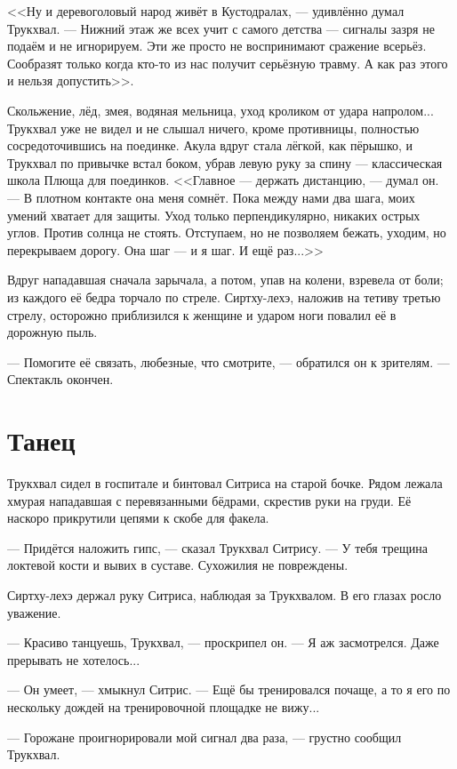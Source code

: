 <<Ну и деревоголовый народ живёт в Кустодралах, --- удивлённо думал Трукхвал.
--- Нижний этаж же всех учит с самого детства --- сигналы зазря не подаём и не игнорируем.
Эти же просто не воспринимают сражение всерьёз.
Сообразят только когда кто-то из нас получит серьёзную травму.
А как раз этого и нельзя допустить>>.

Скольжение, лёд, змея, водяная мельница, уход кроликом от удара напролом...
Трукхвал уже не видел и не слышал ничего, кроме противницы, полностью сосредоточившись на поединке.
Акула вдруг стала лёгкой, как пёрышко, и Трукхвал по привычке встал боком, убрав левую руку за спину --- классическая школа Плюща для поединков.
<<Главное --- держать дистанцию, --- думал он.
--- В плотном контакте она меня сомнёт.
Пока между нами два шага, моих умений хватает для защиты.
Уход только перпендикулярно, никаких острых углов.
Против солнца не стоять.
Отступаем, но не позволяем бежать, уходим, но перекрываем дорогу.
Она шаг --- и я шаг.
И ещё раз...>>

Вдруг нападавшая сначала зарычала, а потом, упав на колени, взревела от боли;
из каждого её бедра торчало по стреле.
Сиртху-лехэ, наложив на тетиву третью стрелу, осторожно приблизился к женщине и ударом ноги повалил её в дорожную пыль.

--- Помогите её связать, любезные, что смотрите, --- обратился он к зрителям.
--- Спектакль окончен.

\section{Танец}

Трукхвал сидел в госпитале и бинтовал Ситриса на старой бочке.
Рядом лежала хмурая нападавшая с перевязанными бёдрами, скрестив руки на груди.
Её наскоро прикрутили цепями к скобе для факела.

--- Придётся наложить гипс, --- сказал Трукхвал Ситрису.
--- У тебя трещина локтевой кости и вывих в суставе.
Сухожилия не повреждены.

Сиртху-лехэ держал руку Ситриса, наблюдая за Трукхвалом.
В его глазах росло уважение.

--- Красиво танцуешь, Трукхвал, --- проскрипел он.
--- Я аж засмотрелся.
Даже прерывать не хотелось...

--- Он умеет, --- хмыкнул Ситрис.
--- Ещё бы тренировался почаще, а то я его по нескольку дождей на тренировочной площадке не вижу...

--- Горожане проигнорировали мой сигнал два раза, --- грустно сообщил Трукхвал.


